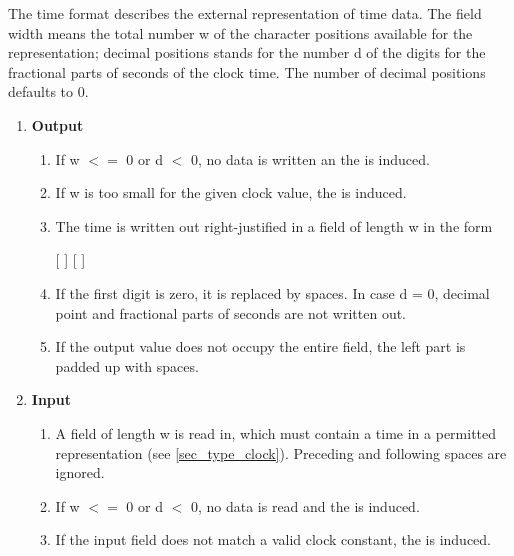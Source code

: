The time format describes the external representation of time data. The
field width means the total number w of the character positions
available for the representation; decimal positions stands for the
number d of the digits for the fractional parts of seconds of the clock
time. 
The number of decimal positions defaults to 0.
\begin{enumerate}
\item {\bf Output}\\
\begin{enumerate}

\item If w $<=$ 0 or d $<$ 0, no data is written an the 
   is induced.

\item If w is too small for the given clock value, the 
   is induced.

\item The time is written out right-justified in a field of length w in the
form

[  ]  [  ]

\item If the first digit is zero, it is replaced by spaces. In case d = 0,
decimal point and fractional parts of seconds are not written out.

\item If the output value does not occupy the entire field, the left part is
padded up with spaces.
\end{enumerate}

\item {\bf Input}\\
\begin{enumerate}
\item A field of length w is read in, which must contain a time in a permitted
representation (see \ref{sec_type_clock}). Preceding and following spaces are ignored.

\item If w $<=$ 0 or d $<$ 0, no data is read and the 
   is induced.

\item If the input field does not match a valid clock constant, the 
    is induced.


\end{enumerate}
\end{enumerate}
